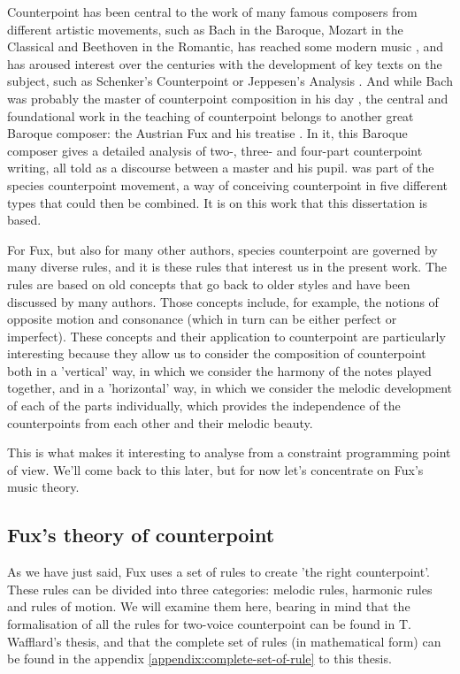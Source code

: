 Counterpoint has been central to the work of many famous composers from different artistic movements, such as Bach in the Baroque, Mozart in the Classical and Beethoven in the Romantic, has reached some modern music \cite{altozano2017contrapunto}, and has aroused interest over the centuries with the development of key texts on the subject, such as Schenker's Counterpoint \cite{schenker1906} or Jeppesen's Analysis \cite{jeppesen1960}. And while Bach was probably the master of counterpoint composition in his day \cite{yearsley2002}, the central and foundational work in the teaching of counterpoint belongs to another great Baroque composer: the Austrian Fux and his treatise \gap. In it, this Baroque composer gives a detailed analysis of two-, three- and four-part counterpoint writing, all told as a discourse between a master and his pupil. \gaps was part of the species counterpoint movement, a way of conceiving counterpoint in five different types that could then be combined. It is on this work that this dissertation is based.


For Fux, but also for many other authors, species counterpoint are governed by many diverse rules, and it is these rules that interest us in the present work. The rules are based on old concepts that go back to older styles \cite{crocker1962} and have been discussed by many authors.  Those concepts include, for example, the notions of opposite motion and consonance (which in turn can be either perfect or imperfect). These concepts and their application to counterpoint are particularly interesting because they allow us to consider the composition of counterpoint both in a 'vertical' way, in which we consider the harmony of the notes played together, and in a 'horizontal' way, in which we consider the melodic development of each of the parts individually, which provides the independence of the counterpoints from each other and their melodic beauty.

This is what makes it interesting to analyse from a constraint programming point of view. We'll come back to this later, but for now let's concentrate on Fux's music theory.

\subsection{Fux's theory of counterpoint}
As we have just said, Fux uses a set of rules to create 'the right counterpoint'. These rules can be divided into three categories: melodic rules, harmonic rules and rules of motion. We will examine them here, bearing in mind that the formalisation of all the rules for two-voice counterpoint can be found in T. Wafflard's thesis, and that the complete set of rules (in mathematical form) can be found in the appendix \ref{appendix:complete-set-of-rule} to this thesis.

